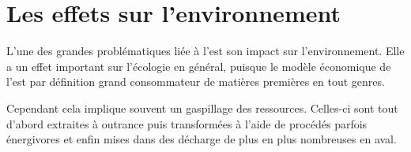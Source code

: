 \section{Les effets sur l’environnement }

\smallbreak L'une des grandes problématiques liée à l'\op est son impact sur l'environnement. Elle a un effet important sur l'écologie en général, puisque le modèle économique de l'\op est par définition grand consommateur de matières premières en tout genres. 

Cependant cela implique souvent un gaspillage des ressources. Celles-ci sont tout d'abord extraites à outrance puis transformées à l'aide de procédés parfois énergivores et enfin mises dans des décharge de plus en plus nombreuses en aval. 